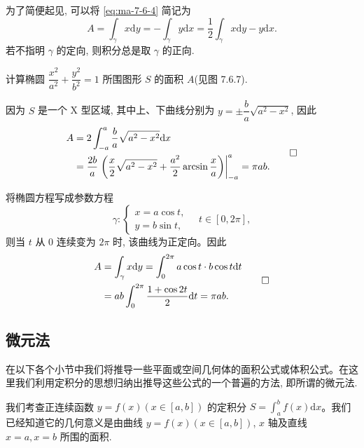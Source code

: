 为了简便起见, 可以将 \eqref{eq:ma-7-6-4} 简记为
\[
  A=\int_\gamma x\mathrm dy=-\int_\gamma y\mathrm dx
  =\frac{1}{2}\int_\gamma x\mathrm dy-y\mathrm dx.
\]
若不指明 $\gamma$ 的定向, 则积分总是取 $\gamma$ 的正向.

\begin{example}\label{example:ma-7-6-3}
计算椭圆 $\dfrac{x^2}{a^2}+\dfrac{y^2}{b^2}=1$ 所围图形 $S$ 的面积 $A$(见图 7.6.7).
\end{example}


\begin{solve}[{解法 1}]
因为 $S$ 是一个 X 型区域, 其中上、下曲线分别为 $y=\pm\dfrac{b}{a}\sqrt{a^2-x^2}$, 因此
\[
\begin{aligned}
  A&=2\int_{-a}^a\frac{b}{a}\sqrt{a^2-x^2}\mathrm dx\\
  &=\frac{2b}{a}\left.\left(\frac{x}{2}\sqrt{a^2-x^2}
  +\frac{a^2}{2}\arcsin\frac{x}{a}\right)\right|_{-a}^a
  =\pi ab.
\end{aligned}
\qedhere
\]
\end{solve}


\begin{solve}[{解法 2}]
将椭圆方程写成参数方程
\[
  \gamma:
  \begin{cases}
    x=a\cos t,\\
    y=b\sin t,
  \end{cases}
  \quad t\in[0,2\pi],
\]
则当 $t$ 从 $0$ 连续变为 $2\pi$ 时, 该曲线为正定向。因此
\[
\begin{aligned}
  A&=\int_\gamma x\mathrm dy
  =\int_0^{2\pi}a\cos t\cdot b\cos t\mathrm dt\\
  &=ab\int_0^{2\pi}\frac{1+\cos2t}{2}\mathrm dt
  =\pi ab.
\end{aligned}
\qedhere
\]
\end{solve}


\subsection{微元法}
\label{subsec:ma-7-6-3}

在以下各个小节中我们将推导一些平面或空间几何体的面积公式或体积公式。在这里我们利用定积分的思想归纳出推导这些公式的一个普遍的方法, 即所谓的微元法.

我们考查正连续函数 $y=f(x)(x\in[a,b])$ 的定积分 $S=\int_a^b f(x)\mathrm dx$。我们已经知道它的几何意义是由曲线 $y=f(x)(x\in[a,b])$, $x$ 轴及直线 $x=a,x=b$ 所围的面积.

